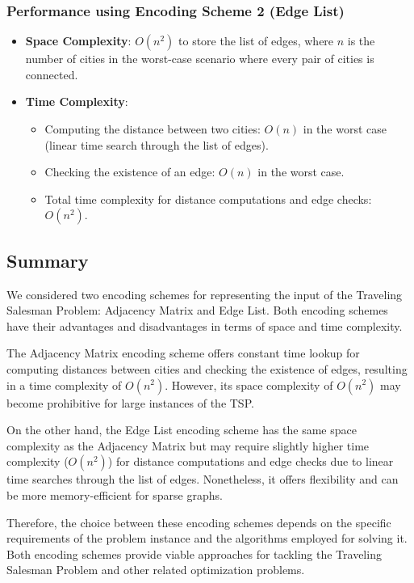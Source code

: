 \documentclass{article}
\renewcommand{\_}{\ifincsname_\else\legacyunderscore\fi}
\begin{document}
\subsubsection{Performance using Encoding Scheme 2 (Edge List)}

\begin{itemize}
    \item \textbf{Space Complexity}: $O(n^2)$ to store the list of edges, where $n$ is the number of cities in the worst-case scenario where every pair of cities is connected.
    \item \textbf{Time Complexity}:
    \begin{itemize}
        \item Computing the distance between two cities: $O(n)$ in the worst case (linear time search through the list of edges).
        \item Checking the existence of an edge: $O(n)$ in the worst case.
        \item Total time complexity for distance computations and edge checks: $O(n^2)$.
    \end{itemize}
\end{itemize}
\subsection{Summary}
We considered two encoding schemes for representing the input of the Traveling Salesman Problem: Adjacency Matrix and Edge List. Both encoding schemes have their advantages and disadvantages in terms of space and time complexity.

The Adjacency Matrix encoding scheme offers constant time lookup for computing distances between cities and checking the existence of edges, resulting in a time complexity of $O(n^2)$. However, its space complexity of $O(n^2)$ may become prohibitive for large instances of the TSP.

On the other hand, the Edge List encoding scheme has the same space complexity as the Adjacency Matrix but may require slightly higher time complexity ($O(n^2)$) for distance computations and edge checks due to linear time searches through the list of edges. Nonetheless, it offers flexibility and can be more memory-efficient for sparse graphs.

Therefore, the choice between these encoding schemes depends on the specific requirements of the problem instance and the algorithms employed for solving it. Both encoding schemes provide viable approaches for tackling the Traveling Salesman Problem and other related optimization problems.
\end{document}
